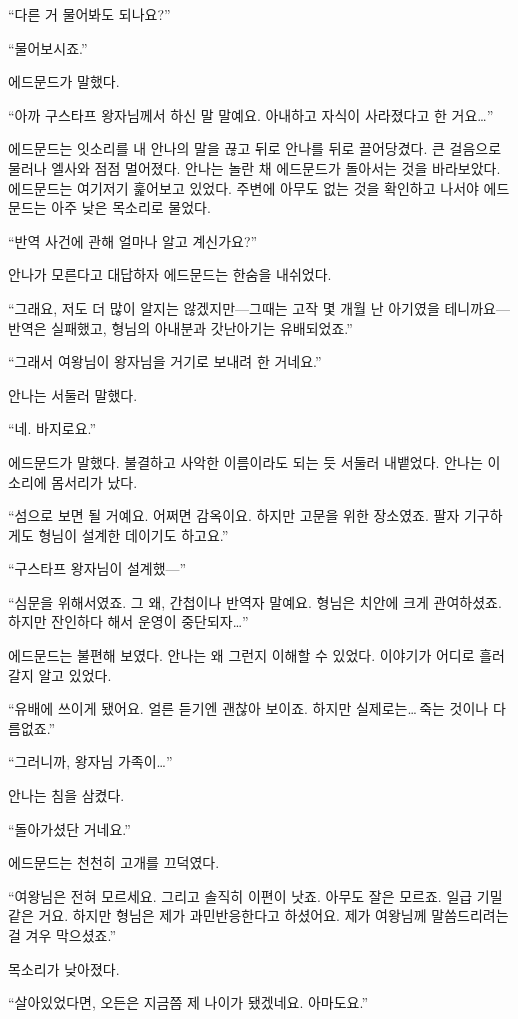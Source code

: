 ``다른 거 물어봐도 되나요?''

``물어보시죠.''

에드문드가 말했다.

``아까 구스타프 왕자님께서 하신 말 말예요. 아내하고 자식이 사라졌다고 한 거요\ldots''

에드문드는 잇소리를 내 안나의 말을 끊고 뒤로 안나를 뒤로 끌어당겼다. 큰 걸음으로 물러나 엘사와 점점 멀어졌다. 안나는 놀란 채 에드문드가 돌아서는 것을 바라보았다. 에드문드는 여기저기 훑어보고 있었다. 주변에 아무도 없는 것을 확인하고 나서야 에드문드는 아주 낮은 목소리로 물었다.

``반역 사건에 관해 얼마나 알고 계신가요?''

안나가 모른다고 대답하자 에드문드는 한숨을 내쉬었다.

``그래요, 저도 더 많이 알지는 않겠지만—그때는 고작 몇 개월 난 아기였을 테니까요—반역은 실패했고, 형님의 아내분과 갓난아기는 유배되었죠.''

``그래서 여왕님이 왕자님을 거기로 보내려 한 거네요.''

안나는 서둘러 말했다.

``네. 바지로요.''

에드문드가 말했다. 불결하고 사악한 이름이라도 되는 듯 서둘러 내뱉었다. 안나는 이 소리에 몸서리가 났다.

``섬으로 보면 될 거예요. 어쩌면 감옥이요. 하지만 고문을 위한 장소였죠. 팔자 기구하게도 형님이 설계한 데이기도 하고요.''

``구스타프 왕자님이 설계했—''

``심문을 위해서였죠. 그 왜, 간첩이나 반역자 말예요. 형님은 치안에 크게 관여하셨죠. 하지만 잔인하다 해서 운영이 중단되자\ldots''

에드문드는 불편해 보였다. 안나는 왜 그런지 이해할 수 있었다. 이야기가 어디로 흘러갈지 알고 있었다.

``유배에 쓰이게 됐어요. 얼른 듣기엔 괜찮아 보이죠. 하지만 실제로는\ldots\,죽는 것이나 다름없죠.''

``그러니까, 왕자님 가족이\ldots''

안나는 침을 삼켰다.

``돌아가셨단 거네요.''

에드문드는 천천히 고개를 끄덕였다.

``여왕님은 전혀 모르세요. 그리고 솔직히 이편이 낫죠. 아무도 잘은 모르죠. 일급 기밀 같은 거요. 하지만 형님은 제가 과민반응한다고 하셨어요. 제가 여왕님께 말씀드리려는 걸 겨우 막으셨죠.''

목소리가 낮아졌다.

``살아있었다면, 오든은 지금쯤 제 나이가 됐겠네요. 아마도요.''

